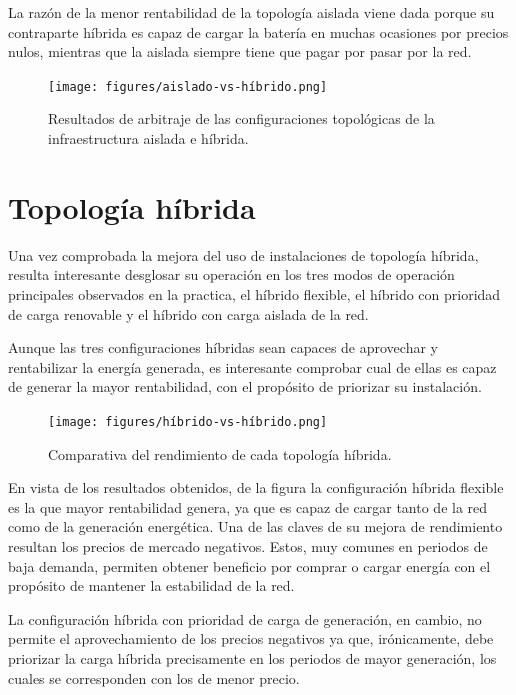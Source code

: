 La razón de la menor rentabilidad de la topología aislada viene dada porque su contraparte híbrida es capaz de cargar la batería en muchas ocasiones por precios nulos, mientras que la aislada siempre tiene que pagar por pasar por la red.

\begin{figure}
  \centering
  \texttt{[image: figures/aislado-vs-híbrido.png]}
  \caption{Resultados de arbitraje de las configuraciones topológicas de la infraestructura aislada e híbrida.}
  \label{fig:aislado-vs-híbrido}
\end{figure}

\section{Topología híbrida}
\label{makereference7.4}

Una vez comprobada la mejora del uso de instalaciones de topología híbrida, resulta interesante desglosar su operación en los tres modos de operación principales observados en la practica, el híbrido flexible, el híbrido con prioridad de carga renovable y el híbrido con carga aislada de la red.

Aunque las tres configuraciones híbridas sean capaces de aprovechar y rentabilizar la energía generada, es interesante comprobar cual de ellas es capaz de generar la mayor rentabilidad, con el propósito de priorizar su instalación.

\begin{figure}
  \centering
  \texttt{[image: figures/híbrido-vs-híbrido.png]}
  \caption{Comparativa del rendimiento de cada topología híbrida.}
  \label{fig:híbrido-vs-híbrido}
\end{figure}

En vista de los resultados obtenidos, de la figura  la configuración híbrida flexible es la que mayor rentabilidad genera, ya que es capaz de cargar tanto de la red como de la generación energética. Una de las claves de su mejora de rendimiento resultan los precios de mercado negativos. Estos, muy comunes en periodos de baja demanda, permiten obtener beneficio por comprar o cargar energía con el propósito de mantener la estabilidad de la red.

La configuración híbrida con prioridad de carga de generación, en cambio, no permite el aprovechamiento de los precios negativos ya que, irónicamente, debe priorizar la carga híbrida precisamente en los periodos de mayor generación, los cuales se corresponden con los de menor precio.

